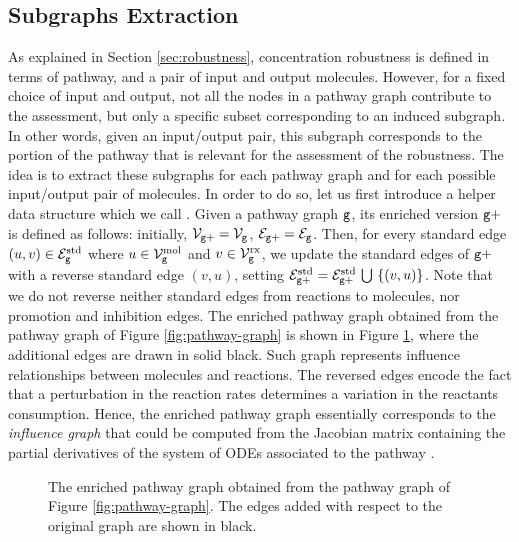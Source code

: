 \subsection{Subgraphs Extraction}\label{sec:subgraphs-extraction}
As explained in Section \ref{sec:robustness}, concentration robustness is defined in terms of pathway, and a pair of input and output molecules. However, for a fixed choice of input and output, not all the nodes in a pathway graph contribute to the assessment, but only a specific subset corresponding to an induced subgraph. In other words, given an input/output pair, this subgraph corresponds to the portion of the pathway that is relevant for the assessment of the robustness. The idea is to extract these subgraphs for each pathway graph and for each possible input/output pair of molecules. In order to do so, let us first introduce a helper data structure which we call . Given a pathway graph $\mathtt{g}$, its enriched version $\mathtt{g+}$ is defined as follows: initially, $\Nodes{g+} = \Nodes{g}$, $\Edges{g+} = \Edges{g}$. Then, for every standard edge $(u, v) \in \StdEdges{g}$ where $u \in \MolNodes{g}$ and $v \in \RxNodes{g}$, we update the standard edges of $\mathtt{g+}$ with a reverse standard edge $(v,u)$, setting $\StdEdges{g+} = \StdEdges{g+} \Union \Set{(v, u)}$. Note that we do not reverse neither standard edges from reactions to molecules, nor promotion and inhibition edges. The enriched pathway graph obtained from the pathway graph of Figure \ref{fig:pathway-graph} is shown in Figure \ref{fig:pathway-graph-enriched}, where the additional edges are drawn in solid black. Such graph represents influence relationships between molecules and reactions. The reversed edges encode the fact that a perturbation in the reaction rates determines a variation in the reactants consumption. Hence, the enriched pathway graph essentially corresponds to the \emph{influence graph} that could be computed from the Jacobian matrix containing the partial derivatives of the system of ODEs associated to the pathway \citep{fages2008influencegraph}.
\begin{figure}[h!]
    \centering
    \resizebox{.6\textwidth}{!}{}
    \caption{The enriched pathway graph obtained from the pathway graph of Figure \ref{fig:pathway-graph}. The edges added with respect to the original graph are shown in black.}
    \label{fig:pathway-graph-enriched}
\end{figure}

